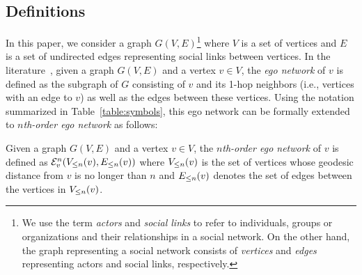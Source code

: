 \subsection{Definitions}\label{subsec:x-egoDefinition}
In this paper, we consider a graph $G(V, E)$\footnote{We use the term {\em actors} and {\em social links} to refer to individuals, groups or organizations and their relationships in a social network. On the other hand, the graph representing a social network consists of {\em vertices} and {\em edges} representing actors and social links, respectively.} where $V$ is a set of vertices and $E$ is a set of undirected edges representing social links between vertices.
In the literature~\cite{egocentric, everett, ICCN:lbcdna, SIMBET}, given a graph $G(V, E)$ and a vertex $v \in V$, the {\em ego network} of $v$ is defined as the subgraph of $G$ consisting of $v$ and its 1-hop neighbors (i.e., vertices with an edge to $v$) as well as the edges between these vertices.
Using the notation summarized in Table~\ref{table:symbols}, this ego network can be formally extended to \emph{$n$th-order ego network} as follows:

\begin{definition}\label{def:multi-order-ego-network}
Given a graph $G(V, E)$ and a vertex $v \in V$, the \emph{$n$th-order ego network} of $v$ is defined as $\ENN{v}{n} (\LV{v}{n}, \LE{v}{n})$ where $\LV{v}{n}$ is the set of vertices whose geodesic distance from $v$ is no longer than $n$ and $\LE{v}{n}$ denotes the set of edges between the vertices in $\LV{v}{n}$.
\end{definition}

